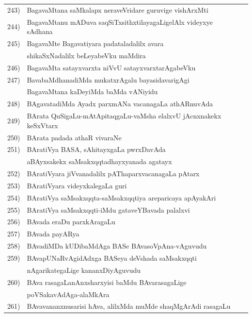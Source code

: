 {\begin{longtable}{@{}cp{7.4cm}r}
243) & BagavaMtana saMkalapx neraveVridare guruvige vishArxMti & \pageref{page71}\\
244) & BagavaMtanu mADuva saqSiTxsithxtilayagaLigelAlx videyxye sAdhana & \pageref{page101}\\
245) & BagavaMte Bagavatiyara padataladalilx avara & \\
     & shikaSxNadalilx beLeyabeVku maMdira & \pageref{page67}\\
246) & BagavaMta satayxvarxta niVvU satayxvarxtarAgabeVku & \pageref{page79}\\ 
247) & BavabaMdhanadiMda mukatxrAgalu bayasidavarigAgi & \\
     & BagavaMtana kaDeyiMda baMda vANiyidu & \pageref{page251}   \\
248) & BAgavatadiMda Ayadx parxmANa vacanagaLa athARnuvAda & \pageref{page164}\\
249) & BArata QuSigaLu-mAtApitaqgaLu-vaMsha elalxvU jAcnxnakekx keSxVtarx & \pageref{page104}\\ 
250) & BArata padada athaR vivaraNe & \pageref{20}\\
251) & BAratiVya BASA, sAhitayxgaLa pwrxDavAda & \\
     & aBAyxsakekx saMsakxqqtadhayxyanada agatayx & \pageref{page37}\\
252) & BAratiVyara jiVvanadalilx pAThaparxvacanagaLa pAtarx & \pageref{page105}\\
253) & BAratiVyara videyxkalegaLa guri & \pageref{page22}\\
254) & BAratiVya saMsakxqqta-saMsakxqqtiya areparicaya apAyakAri & \pageref{page30}\\
255) & BAratiVya saMsakxqqti-iMdu gataveYBavada palalxvi & \pageref{page32}\\
256) & BAvada eraDu parxkAragaLu & \pageref{page230}\\
257) & BAvada payARya & \pageref{page230}\\
258) & BAvadiMDa kUDibaMdAga BASe BAvasoVpAna-vAguvudu & \pageref{page26}\\
259) & BAvapUNaRvAgidAdxga BASeya deVshada saMsakxqqti & \\
     & nAgarikategaLige kananxDiyAguvudu & \pageref{page16a}\\
260) & BAva rasagaLanAnxsharxyisi baMdu BAvarasagaLige & \\
     & poVSakavAdAga-alaMkAra & \pageref{page245}\\
261) & BAvavananxnusarisi hAva, alilxMda muMde shaqMgArAdi rasagaLu &\pageref{page226}\\

\end{longtable}}
